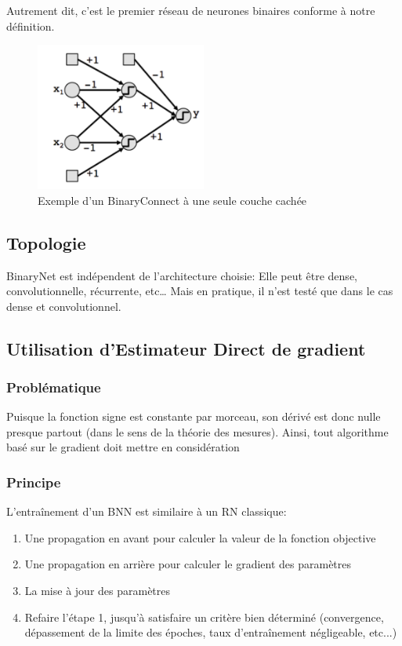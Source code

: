 Autrement dit, c'est le premier réseau de neurones binaires conforme à notre définition. 
\begin{figure}[h!]
	\centering
	\includegraphics[width=0.5\textwidth]{Figures/BinaryConnect.png}
	\caption{Exemple d'un BinaryConnect à une seule couche cachée}
	\label{fig:BinaryConnect}
\end{figure}
\subsection{Topologie}
BinaryNet est indépendent de l'architecture choisie: Elle peut être dense, convolutionnelle, récurrente, etc\dots 
\newline Mais en pratique, il n'est testé que dans le cas dense et convolutionnel.



\subsection{Utilisation d'Estimateur Direct de gradient}
\subsubsection{Problématique}
Puisque la fonction signe est constante par morceau, son dérivé est donc nulle presque partout (dans le sens de la théorie des mesures).
\newline Ainsi, tout algorithme basé sur le gradient doit mettre en considération
\subsubsection{Principe}
L'entraînement d'un BNN est similaire à un RN classique:
\begin{enumerate}
	\item Une propagation en avant pour calculer la valeur de la fonction objective
	\item Une propagation en arrière pour calculer le gradient des paramètres
	\item La mise à jour des paramètres
	\item Refaire l'étape 1, jusqu'à satisfaire un critère bien déterminé (convergence, dépassement de la limite des époches, taux d'entraînement négligeable, etc...)
\end{enumerate}

